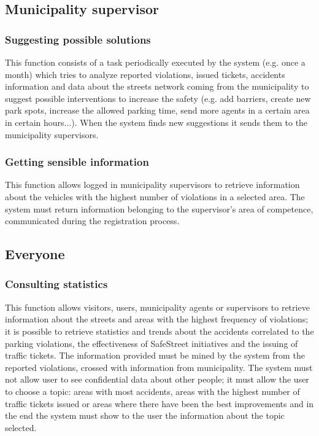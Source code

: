 \documentclass[a4paper]{report}
\begin{document}
\subsection{Municipality supervisor}

\subsubsection{Suggesting possible solutions} 
This function consists of a task periodically executed by the system (e.g. once a month) which tries to analyze reported violations, issued tickets, accidents information and data about the streets network coming from the municipality to suggest possible interventions to increase the safety (e.g. add barriers, create new park spots, increase the allowed parking time, send more agents in a certain area in certain hours...). When the system finds new suggestions it sends them to the municipality supervisors.

\subsubsection{Getting sensible information}
This function allows logged in municipality supervisors to retrieve information about the vehicles with the highest number of violations in a selected area. The system must return information belonging to the supervisor's area of competence, communicated during the registration process.

\subsection{Everyone} 

\subsubsection{Consulting statistics}
This function allows visitors, users, municipality agents or supervisors to retrieve information about the streets and areas with the highest frequency of violations; it is possible to retrieve statistics and trends about the accidents correlated to the parking violations, the effectiveness of SafeStreet initiatives and the issuing of traffic tickets. The information provided must be mined by the system from the reported violations, crossed with information from municipality. The system must not allow user to see confidential data about other people; it must allow the user to choose a topic: areas with most accidents, areas with the highest number of traffic tickets issued or areas where there have been the best improvements and in the end the system must show to the user the information about the topic selected.
\end{document}
